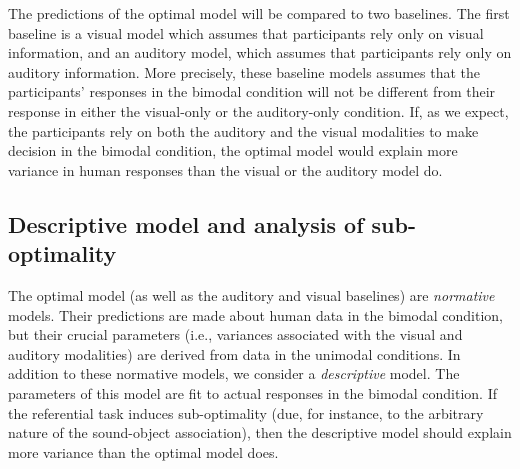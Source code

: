 \documentclass[english,floatsintext,man]{apa6}
\theoremstyle{definition}
\theoremstyle{definition}
\theoremstyle{definition}
\theoremstyle{remark}
\begin{document}
The predictions of the optimal model will be compared to two baselines.
The first baseline is a visual model which assumes that participants
rely only on visual information, and an auditory model, which assumes
that participants rely only on auditory information. More precisely,
these baseline models assumes that the participants' responses in the
bimodal condition will not be different from their response in either
the visual-only or the auditory-only condition. If, as we expect, the
participants rely on both the auditory and the visual modalities to make
decision in the bimodal condition, the optimal model would explain more
variance in human responses than the visual or the auditory model do.

\subsection{Descriptive model and analysis of
sub-optimality}\label{descriptive-model-and-analysis-of-sub-optimality}

The optimal model (as well as the auditory and visual baselines) are
\emph{normative} models. Their predictions are made about human data in
the bimodal condition, but their crucial parameters (i.e., variances
associated with the visual and auditory modalities) are derived from
data in the unimodal conditions. In addition to these normative models,
we consider a \emph{descriptive} model. The parameters of this model are
fit to actual responses in the bimodal condition. If the referential
task induces sub-optimality (due, for instance, to the arbitrary nature
of the sound-object association), then the descriptive model should
explain more variance than the optimal model does.
\end{document}

